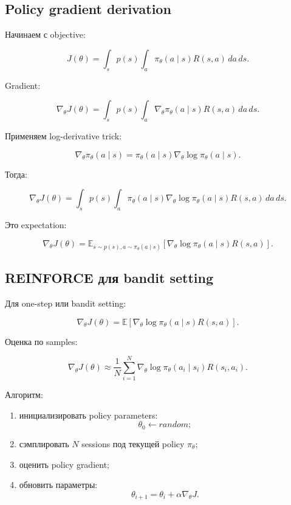 \documentclass[a4paper,12pt]{article}
\begin{document}
\subsection{Policy gradient derivation}

Начинаем с objective:

\[
J(\theta)
=
\int_s
p(s)
\int_a
\pi_\theta(a\mid s)
R(s,a)
\,da\,ds.
\]

Gradient:

\[
\nabla_\theta J(\theta)
=
\int_s
p(s)
\int_a
\nabla_\theta \pi_\theta(a\mid s)
R(s,a)
\,da\,ds.
\]

Применяем log-derivative trick:

\[
\nabla_\theta \pi_\theta(a\mid s)
=
\pi_\theta(a\mid s)
\nabla_\theta
\log \pi_\theta(a\mid s).
\]

Тогда:

\[
\nabla_\theta J(\theta)
=
\int_s
p(s)
\int_a
\pi_\theta(a\mid s)
\nabla_\theta
\log \pi_\theta(a\mid s)
R(s,a)
\,da\,ds.
\]

Это expectation:

\[
\nabla_\theta J(\theta)
=
\mathbb{E}_{s\sim p(s), a\sim \pi_\theta(a\mid s)}
[
\nabla_\theta \log \pi_\theta(a\mid s) R(s,a)
].
\]

\subsection{REINFORCE для bandit setting}

Для one-step или bandit setting:

\[
\nabla_\theta J(\theta)
=
\mathbb{E}
[
\nabla_\theta
\log \pi_\theta(a\mid s)
R(s,a)
].
\]

Оценка по samples:

\[
\nabla_\theta J(\theta)
\approx
\frac{1}{N}
\sum_{i=1}^{N}
\nabla_\theta
\log \pi_\theta(a_i\mid s_i)
R(s_i,a_i).
\]

Алгоритм:

\begin{enumerate}
    \item инициализировать policy parameters:
    \[
    \theta_0 \leftarrow random;
    \]

    \item сэмплировать \(N\) sessions под текущей policy \(\pi_\theta\);

    \item оценить policy gradient;

    \item обновить параметры:
    \[
    \theta_{i+1}
    =
    \theta_i
    +
    \alpha \nabla_\theta J.
    \]
\end{enumerate}
\end{document}
